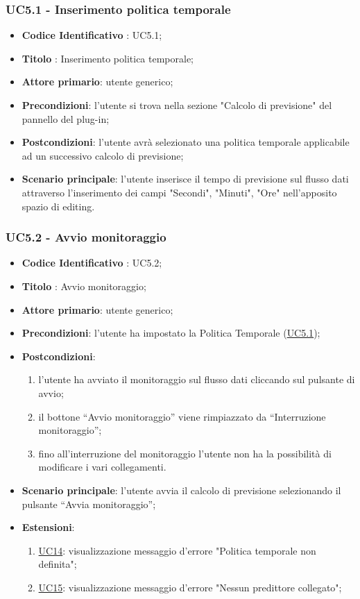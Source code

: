 	
	\label{par:UC5.1}
	\subsubsection{UC5.1 - Inserimento politica temporale}
		\begin{itemize}
			\item\textbf{Codice Identificativo} : UC5.1;
			\item\textbf{Titolo} : Inserimento politica temporale;
			\item\textbf{Attore primario}: utente generico;
			\item\textbf{Precondizioni}: l'utente si trova nella sezione "Calcolo di previsione" del pannello del plug-in;
			\item\textbf{Postcondizioni}: l'utente avrà selezionato una politica temporale applicabile ad un successivo calcolo di previsione;
			\item\textbf{Scenario principale}: l'utente inserisce il tempo di previsione sul flusso dati attraverso l'inserimento dei campi "Secondi", "Minuti", "Ore" nell'apposito spazio di editing.
		\end{itemize}	

	\label{par:UC5.2}
	\subsubsection{UC5.2 - Avvio monitoraggio}
		\begin{itemize}
			\item\textbf{Codice Identificativo} : UC5.2;
			\item\textbf{Titolo} : Avvio monitoraggio;
			\item\textbf{Attore primario}: utente generico;
			\item\textbf{Precondizioni}: l'utente ha impostato la Politica Temporale (\hyperref[par:UC5.1]{UC5.1});
			\item\textbf{Postcondizioni}:
				\begin{enumerate}
					\item l'utente ha avviato il monitoraggio sul flusso dati cliccando sul pulsante di avvio;
					\item il bottone “Avvio monitoraggio” viene rimpiazzato da “Interruzione monitoraggio”;
					\item fino all'interruzione del monitoraggio l'utente non ha la possibilità di modificare i vari collegamenti.
				\end{enumerate}
			\item\textbf{Scenario principale}: l'utente avvia il calcolo di previsione selezionando il pulsante “Avvia monitoraggio”;
			\item\textbf{Estensioni}:
				\begin{enumerate}
					\item \hyperref[par:UC14]{UC14}: visualizzazione messaggio d'errore "Politica temporale non definita";
					\item \hyperref[par:UC15]{UC15}: visualizzazione messaggio d'errore "Nessun predittore collegato";
				\end{enumerate}
			
				
		\end{itemize}	
		
